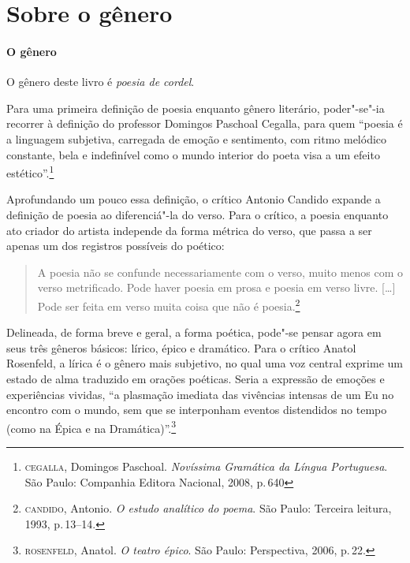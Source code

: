 \documentclass[11pt]{extarticle}
\begin{document}

\section{Sobre o gênero}

\paragraph{O gênero} O gênero deste livro é \textit{poesia de cordel}. 


Para uma primeira definição de poesia enquanto gênero literário, poder"-se"-ia recorrer à definição do professor Domingos Paschoal Cegalla, para quem ``poesia é a linguagem subjetiva, carregada de emoção e sentimento, com ritmo melódico constante, bela e indefinível como o mundo interior do poeta visa a um efeito estético''.\footnote{\textsc{cegalla}, Domingos Paschoal. \textit{Novíssima Gramática da Língua Portuguesa}. São Paulo: Companhia Editora Nacional, 2008, p.\,640}

Aprofundando um pouco essa definição, o crítico Antonio Candido expande a definição de poesia ao diferenciá"-la do verso.
Para o crítico, a poesia enquanto ato criador do artista independe da forma métrica do verso, que passa a ser apenas um dos registros possíveis do poético:

\begin{quote}
A poesia não se confunde necessariamente com o verso, muito menos com o verso metrificado. Pode haver poesia em prosa e poesia em verso livre. [\ldots]
Pode ser feita em verso muita coisa que não é poesia.\footnote{\textsc{candido}, Antonio. \textit{O estudo analítico do poema}. São Paulo: Terceira leitura, 1993, p.\,13--14.}
\end{quote}

Delineada, de forma breve e geral, a forma poética, pode"-se pensar agora em seus três gêneros básicos: lírico, épico e dramático.
Para o crítico Anatol Rosenfeld, a lírica é o gênero mais subjetivo, no qual uma voz central exprime um estado de alma traduzido em orações poéticas.
Seria a expressão de emoções e experiências vividas, ``a plasmação imediata das vivências intensas de um Eu no encontro com o mundo, sem que se interponham eventos distendidos no tempo (como na Épica e na Dramática)''.\footnote{\textsc{rosenfeld}, Anatol. \textit{O teatro épico}. São Paulo: Perspectiva, 2006, p.\,22.}
\end{document}
